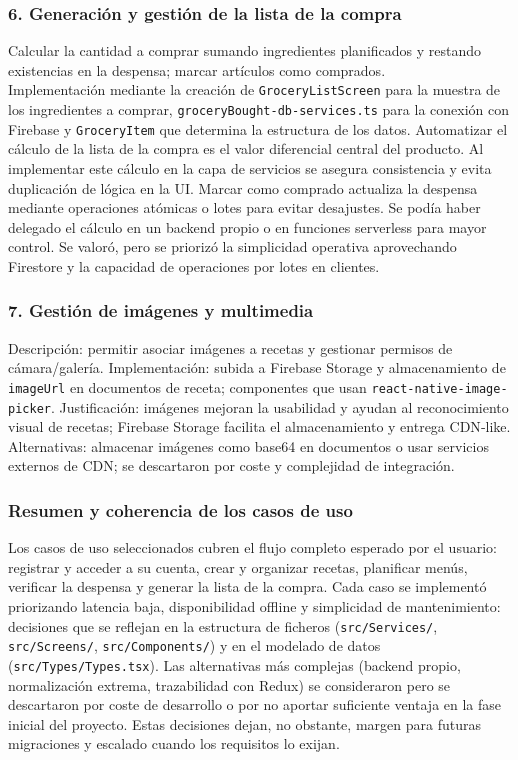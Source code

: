 \documentclass[twoside, openright, 11pt]{report}
\begin{document}
		\subsubsection{6. Generación y gestión de la lista de la compra}
		Calcular la cantidad a comprar sumando ingredientes planificados y restando existencias en la despensa; marcar artículos como comprados.\\
		Implementación mediante la creación de \texttt{GroceryListScreen} para la muestra de los ingredientes a comprar, \texttt{groceryBought-db-services.ts} para la conexión con Firebase y \texttt{GroceryItem} que determina la estructura de los datos.
		Automatizar el cálculo de la lista de la compra es el valor diferencial central del producto. Al implementar este cálculo en la capa de servicios se asegura consistencia y evita duplicación de lógica en la UI. Marcar como comprado actualiza la despensa mediante operaciones atómicas o lotes para evitar desajustes.  
		Se podía haber delegado el cálculo en un backend propio o en funciones serverless para mayor control. Se valoró, pero se priorizó la simplicidad operativa aprovechando Firestore y la capacidad de operaciones por lotes en clientes.
		
		\subsubsection{7. Gestión de imágenes y multimedia}
		Descripción: permitir asociar imágenes a recetas y gestionar permisos de cámara/galería.  
		Implementación: subida a Firebase Storage y almacenamiento de \texttt{imageUrl} en documentos de receta; componentes que usan \texttt{react-native-image-picker}.  
		Justificación: imágenes mejoran la usabilidad y ayudan al reconocimiento visual de recetas; Firebase Storage facilita el almacenamiento y entrega CDN‑like.  
		Alternativas: almacenar imágenes como base64 en documentos o usar servicios externos de CDN; se descartaron por coste y complejidad de integración.
		
		\subsubsection*{Resumen y coherencia de los casos de uso}
		Los casos de uso seleccionados cubren el flujo completo esperado por el usuario: registrar y acceder a su cuenta, crear y organizar recetas, planificar menús, verificar la despensa y generar la lista de la compra. Cada caso se implementó priorizando latencia baja, disponibilidad offline y simplicidad de mantenimiento: decisiones que se reflejan en la estructura de ficheros (\texttt{src/Services/}, \texttt{src/Screens/}, \texttt{src/Components/}) y en el modelado de datos (\texttt{src/Types/Types.tsx}). Las alternativas más complejas (backend propio, normalización extrema, trazabilidad con Redux) se consideraron pero se descartaron por coste de desarrollo o por no aportar suficiente ventaja en la fase inicial del proyecto. Estas decisiones dejan, no obstante, margen para futuras migraciones y escalado cuando los requisitos lo exijan.
\end{document}
